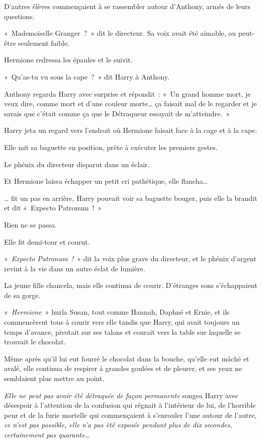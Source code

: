D'autres élèves commençaient à se rassembler autour d'Anthony, armés de leurs questions.

«~Mademoiselle Granger~?~»
dit le directeur.
Sa voix avait été aimable, ou peut-être seulement faible.

Hermione redressa les épaules et le suivit.

«~Qu'as-tu vu sous la cape~?~»
dit Harry à Anthony.

Anthony regarda Harry avec surprise et répondit~: «~Un grand homme mort, je veux dire, comme mort et d'une couleur morte… ça faisait mal de le regarder et je savais que c'était comme ça que le Détraqueur essayait de m'atteindre.~»

Harry jeta un regard vers l'endroit où Hermione faisait face à la cage et à la cape.

Elle mit sa baguette en position, prête à exécuter les premiers gestes.

Le phénix du directeur disparut dans un éclair.

Et Hermione laissa échapper un petit cri pathétique, elle flancha…

… fit un pas en arrière, Harry pouvait voir sa baguette bouger, puis elle la brandit et dit «~Expecto Patronum~!~»

Rien ne se passa.

Elle fit demi-tour et courut.

«~\emph{Expecto Patronum~!}~» dit la voix plus grave du directeur, et le phénix d'argent revint à la vie dans un autre éclat de lumière.

La jeune fille chancela, mais elle continua de courir.
D'étranges sons s'échappaient de sa gorge.

«~\emph{Hermione}~» hurla Susan, tout comme Hannah, Daphné et Ernie, et ils commencèrent tous à courir vers elle tandis que Harry, qui avait toujours un temps d'avance, pivotait sur ses talons et courait vers la table sur laquelle se trouvait le chocolat.

Même après qu'il lui eut fourré le chocolat dans la bouche, qu'elle eut mâché et avalé, elle continua de respirer à grandes goulées et de pleurer, et ses yeux ne semblaient plus mettre au point.

\emph{Elle ne peut pas avoir été détraquée de façon permanente} songea Harry avec désespoir à l'attention de la confusion qui régnait à l'intérieur de lui, de l'horrible peur et de la furie mortelle qui commençaient à s'enrouler l'une autour de l'autre, \emph{ce n'est pas possible, elle n'a pas été exposée pendant plus de dix secondes, certainement pas quarante…}

